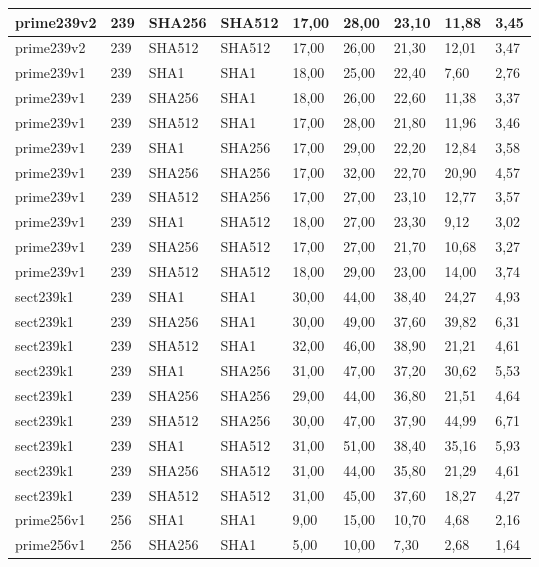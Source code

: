 \begin{longtable}{| l | l | l | l | l |l |l |l |l |}
prime239v2 & 239 & SHA256 & SHA512 & 17,00 & 28,00 & 23,10 & 11,88 & 3,45 \\ \hline 
prime239v2 & 239 & SHA512 & SHA512 & 17,00 & 26,00 & 21,30 & 12,01 & 3,47 \\ \hline 
prime239v1 & 239 & SHA1 & SHA1 & 18,00 & 25,00 & 22,40 & 7,60 & 2,76 \\ \hline 
prime239v1 & 239 & SHA256 & SHA1 & 18,00 & 26,00 & 22,60 & 11,38 & 3,37 \\ \hline 
prime239v1 & 239 & SHA512 & SHA1 & 17,00 & 28,00 & 21,80 & 11,96 & 3,46 \\ \hline 
prime239v1 & 239 & SHA1 & SHA256 & 17,00 & 29,00 & 22,20 & 12,84 & 3,58 \\ \hline 
prime239v1 & 239 & SHA256 & SHA256 & 17,00 & 32,00 & 22,70 & 20,90 & 4,57 \\ \hline 
prime239v1 & 239 & SHA512 & SHA256 & 17,00 & 27,00 & 23,10 & 12,77 & 3,57 \\ \hline 
prime239v1 & 239 & SHA1 & SHA512 & 18,00 & 27,00 & 23,30 & 9,12 & 3,02 \\ \hline 
prime239v1 & 239 & SHA256 & SHA512 & 17,00 & 27,00 & 21,70 & 10,68 & 3,27 \\ \hline 
prime239v1 & 239 & SHA512 & SHA512 & 18,00 & 29,00 & 23,00 & 14,00 & 3,74 \\ \hline 
sect239k1 & 239 & SHA1 & SHA1 & 30,00 & 44,00 & 38,40 & 24,27 & 4,93 \\ \hline 
sect239k1 & 239 & SHA256 & SHA1 & 30,00 & 49,00 & 37,60 & 39,82 & 6,31 \\ \hline 
sect239k1 & 239 & SHA512 & SHA1 & 32,00 & 46,00 & 38,90 & 21,21 & 4,61 \\ \hline 
sect239k1 & 239 & SHA1 & SHA256 & 31,00 & 47,00 & 37,20 & 30,62 & 5,53 \\ \hline 
sect239k1 & 239 & SHA256 & SHA256 & 29,00 & 44,00 & 36,80 & 21,51 & 4,64 \\ \hline 
sect239k1 & 239 & SHA512 & SHA256 & 30,00 & 47,00 & 37,90 & 44,99 & 6,71 \\ \hline 
sect239k1 & 239 & SHA1 & SHA512 & 31,00 & 51,00 & 38,40 & 35,16 & 5,93 \\ \hline 
sect239k1 & 239 & SHA256 & SHA512 & 31,00 & 44,00 & 35,80 & 21,29 & 4,61 \\ \hline 
sect239k1 & 239 & SHA512 & SHA512 & 31,00 & 45,00 & 37,60 & 18,27 & 4,27 \\ \hline 
prime256v1 & 256 & SHA1 & SHA1 & 9,00 & 15,00 & 10,70 & 4,68 & 2,16 \\ \hline 
prime256v1 & 256 & SHA256 & SHA1 & 5,00 & 10,00 & 7,30 & 2,68 & 1,64 \\ \hline 

\end{longtable}
